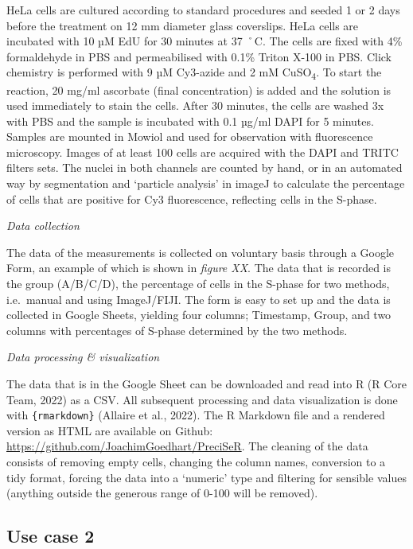 \documentclass[
]{agujournal2019}
\begin{document}
HeLa cells are cultured according to standard procedures and seeded 1 or
2 days before the treatment on 12 mm diameter glass coverslips. HeLa
cells are incubated with 10 µM EdU for 30 minutes at 37 ˚C. The cells
are fixed with 4\% formaldehyde in PBS and permeabilised with 0.1\%
Triton X-100 in PBS. Click chemistry is performed with 9 µM Cy3-azide
and 2 mM CuSO\textsubscript{4}. To start the reaction, 20 mg/ml
ascorbate (final concentration) is added and the solution is used
immediately to stain the cells. After 30 minutes, the cells are washed
3x with PBS and the sample is incubated with 0.1 µg/ml DAPI for 5
minutes. Samples are mounted in Mowiol and used for observation with
fluorescence microscopy. Images of at least 100 cells are acquired with
the DAPI and TRITC filters sets. The nuclei in both channels are counted
by hand, or in an automated way by segmentation and `particle analysis'
in imageJ to calculate the percentage of cells that are positive for Cy3
fluorescence, reflecting cells in the S-phase.

\emph{Data collection}

The data of the measurements is collected on voluntary basis through a
Google Form, an example of which is shown in \emph{figure XX}. The data
that is recorded is the group (A/B/C/D), the percentage of cells in the
S-phase for two methods, i.e.~manual and using ImageJ/FIJI. The form is
easy to set up and the data is collected in Google Sheets, yielding four
columns; Timestamp, Group, and two columns with percentages of S-phase
determined by the two methods.

\emph{Data processing \& visualization}

The data that is in the Google Sheet can be downloaded and read into R
(R Core Team, 2022) as a CSV. All subsequent processing and data
visualization is done with \texttt{\{rmarkdown\}} (Allaire et al.,
2022). The R Markdown file and a rendered version as HTML are available
on Github: \url{https://github.com/JoachimGoedhart/PreciSeR}. The
cleaning of the data consists of removing empty cells, changing the
column names, conversion to a tidy format, forcing the data into a
`numeric' type and filtering for sensible values (anything outside the
generous range of 0-100 will be removed).

\hypertarget{use-case-2}{%
\subsection*{Use case 2}\label{use-case-2}}
\end{document}
